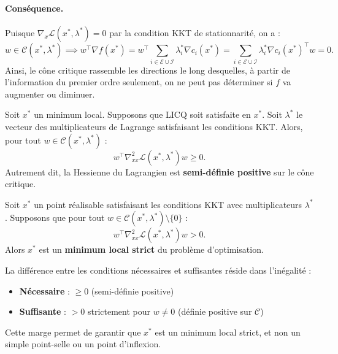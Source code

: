 \begin{remarque}
    \paragraph{Conséquence.} Puisque $\nabla_x \mathcal{L}(x^*, \lambda^*) = 0$ par la condition KKT de stationnarité, on a :
    \begin{equation}
        w \in \mathcal{C}(x^*, \lambda^*) \implies w^\top \nabla f(x^*) = w^\top \sum_{i \in \mathcal{E} \cup \mathcal{I}} \lambda_i^* \nabla c_i(x^*) = \sum_{i \in \mathcal{E} \cup \mathcal{I}} \lambda_i^* \nabla c_i(x^*)^\top w = 0.
    \end{equation}
    Ainsi, le cône critique rassemble les directions le long desquelles, à partir de l'information du premier ordre seulement, on ne peut pas déterminer si $f$ va augmenter ou diminuer.
\end{remarque}

\begin{theoreme}
    Soit $x^*$ un minimum local. Supposons que LICQ soit satisfaite en $x^*$. Soit $\lambda^*$ le vecteur des multiplicateurs de Lagrange satisfaisant les conditions KKT. Alors, pour tout $w \in \mathcal{C}(x^*, \lambda^*)$ :
    \begin{equation}
        w^\top \nabla_{xx}^2 \mathcal{L}(x^*, \lambda^*) w \geq 0.
    \end{equation}
    Autrement dit, la Hessienne du Lagrangien est \textbf{semi-définie positive} sur le cône critique.
\end{theoreme}

\begin{theoreme}
    Soit $x^*$ un point réalisable satisfaisant les conditions KKT avec multiplicateurs $\lambda^*$. Supposons que pour tout $w \in \mathcal{C}(x^*, \lambda^*) \setminus \{0\}$ :
    \begin{equation}
        w^\top \nabla_{xx}^2 \mathcal{L}(x^*, \lambda^*) w > 0.
    \end{equation}
    Alors $x^*$ est un \textbf{minimum local strict} du problème d'optimisation.
\end{theoreme}

\begin{remarque}
    La différence entre les conditions nécessaires et suffisantes réside dans l'inégalité :
    \begin{itemize}
        \item \textbf{Nécessaire} : $\geq 0$ (semi-définie positive)
        \item \textbf{Suffisante} : $> 0$ strictement pour $w \neq 0$ (définie positive sur $\mathcal{C}$)
    \end{itemize}
    Cette marge permet de garantir que $x^*$ est un minimum local strict, et non un simple point-selle ou un point d'inflexion.
\end{remarque}

